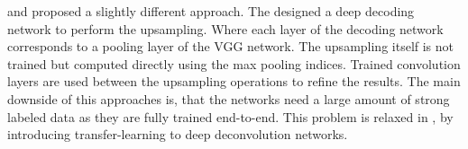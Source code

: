 \cite{deconv1} and \cite{segnet} proposed a slightly different approach. The designed a deep decoding network to perform the upsampling. Where each layer of the decoding network corresponds to a pooling layer of the VGG network. The upsampling itself is not trained but computed directly using the max pooling indices. Trained convolution layers are used between the upsampling operations to refine the results. The main downside of this approaches is, that the networks need a large amount of strong labeled data as they are fully trained end-to-end. This problem is relaxed in \cite{decoupled}, by introducing transfer-learning to deep deconvolution networks.





